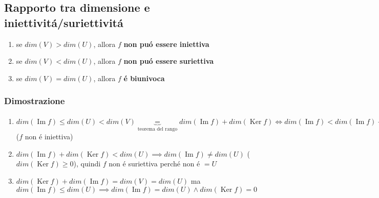 \documentclass{article}
\DeclareMathOperator{\Ker}{Ker}
\DeclareMathOperator{\Ima}{Im}
\begin{document}
\subsection{Rapporto tra dimensione e iniettivitá/suriettivitá}
\begin{enumerate}
	\item se $dim(V) > dim(U)$, allora $f$ \textbf{non puó essere iniettiva}
	\item se $dim(V) < dim(U)$, allora $f$ \textbf{non puó essere suriettiva}
	\item se $dim(V) = dim(U)$, allora $f$ \textbf{é biunivoca}
\end{enumerate}

\subsubsection{Dimostrazione}
\begin{enumerate}
	\item $dim(\Ima{f}) \le dim(U) < dim(V) \underbrace{=}_{\mbox{teorema del rango}} dim(\Ima{f}) + dim(\Ker{f}) \iff dim(\Ima{f}) < dim(\Ima{f}) + dim(\Ker{f}) \iff dim(\Ker{f})> 0 \implies \Ker{f} \ne \{\vec{0}\}$ ($f$ non é iniettiva)
	\item $dim(\Ima{f}) + dim(\Ker{f}) < dim(U) \implies dim(\Ima{f}) \ne dim(U)$ ($dim(\Ker{f}) \ge 0$), quindi $f$ non é suriettiva perché non é $=U$
	\item $dim(\Ker{f}) + dim(\Ima{f}) = dim(V) = dim(U)$ ma $dim(\Ima{f}) \le dim(U) \implies dim(\Ima{f}) = dim(U) \wedge dim(\Ker{f}) = 0$
\end{enumerate}
\end{document}
